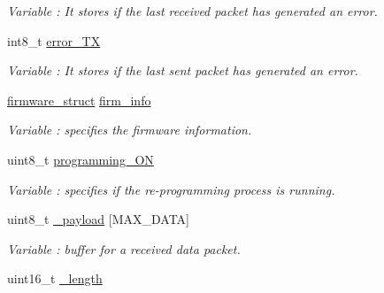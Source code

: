 \begin{DoxyCompactItemize}
\begin{DoxyCompactList}\small\item\em Variable \+: It stores if the last received packet has generated an error. \end{DoxyCompactList}\item 
int8\+\_\+t \hyperlink{class_wasp_x_bee_core_a92c9353405c32b48055041572ce783cf}{error\+\_\+\+TX}\hypertarget{class_wasp_x_bee_core_a92c9353405c32b48055041572ce783cf}{}\label{class_wasp_x_bee_core_a92c9353405c32b48055041572ce783cf}

\begin{DoxyCompactList}\small\item\em Variable \+: It stores if the last sent packet has generated an error. \end{DoxyCompactList}\item 
\hyperlink{structfirmware__struct}{firmware\+\_\+struct} \hyperlink{class_wasp_x_bee_core_a305c4182401ca7d601caf72629ffeb12}{firm\+\_\+info}\hypertarget{class_wasp_x_bee_core_a305c4182401ca7d601caf72629ffeb12}{}\label{class_wasp_x_bee_core_a305c4182401ca7d601caf72629ffeb12}

\begin{DoxyCompactList}\small\item\em Variable \+: specifies the firmware information. \end{DoxyCompactList}\item 
uint8\+\_\+t \hyperlink{class_wasp_x_bee_core_ad4554bd4564bfcb36ee701296f67fda9}{programming\+\_\+\+ON}\hypertarget{class_wasp_x_bee_core_ad4554bd4564bfcb36ee701296f67fda9}{}\label{class_wasp_x_bee_core_ad4554bd4564bfcb36ee701296f67fda9}

\begin{DoxyCompactList}\small\item\em Variable \+: specifies if the re-\/programming process is running. \end{DoxyCompactList}\item 
uint8\+\_\+t \hyperlink{class_wasp_x_bee_core_afa6d30b76bd13b6b9396a6f4764fa223}{\+\_\+payload} \mbox{[}M\+A\+X\+\_\+\+D\+A\+TA\mbox{]}\hypertarget{class_wasp_x_bee_core_afa6d30b76bd13b6b9396a6f4764fa223}{}\label{class_wasp_x_bee_core_afa6d30b76bd13b6b9396a6f4764fa223}

\begin{DoxyCompactList}\small\item\em Variable \+: buffer for a received data packet. \end{DoxyCompactList}\item 
uint16\+\_\+t \hyperlink{class_wasp_x_bee_core_a3ebbcfe263164307fe8496f43a9008b5}{\+\_\+length}\hypertarget{class_wasp_x_bee_core_a3ebbcfe263164307fe8496f43a9008b5}{}\label{class_wasp_x_bee_core_a3ebbcfe263164307fe8496f43a9008b5}


\end{DoxyCompactItemize}
